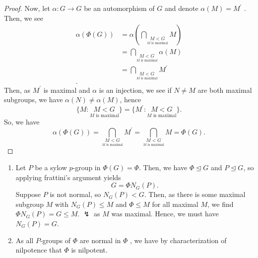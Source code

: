 \documentclass[a4paper]{article}
\begin{document}
\begin{solution}[2]
	\begin{proof}
		Now, let \(\alpha: G \to G\)  be an automorphism of \(G\) and denote \(\alpha \left( M \right)  = M^{\prime}\) . Then, we see
\begin{align*}
\alpha \left( \Phi \left( G \right)  \right)  &= \alpha\left( \bigcap_{\underset{M \text{ is maximal}}{M < G}} M \right)  \\
						      &= \bigcap_{ \underset{ M \text{ is maximal}}{M < G}} \alpha \left( M \right)   \\
						      &= \bigcap_{\underset{M \text{ is maximal}}{M < G}} M^{\prime} \\
.\end{align*}
Then, as \(M^{\prime}\) is maximal and \(\alpha\) is an injection, we see if \(N \neq M\) are both maximal subgroups, we have \(\alpha \left( N \right)  \neq \alpha \left( M \right) \), hence \[\{ M :  \underset{ M \text{ is maximal}}{M < G}\}  = \{M^{\prime} :  \underset{ M \text{ is maximal}}{M < G}\} .\] So, we have \[
	\alpha\left( \Phi \left( G \right)  \right)  = \bigcap_{ \underset{ M \text{ is maximal}}{M < G}} M^{\prime} = \bigcap_{ \underset{ M \text{ is maximal}}{M < G}} M = \Phi\left( G \right)
.\]
\end{proof}
\end{solution}
\newpage
\begin{solution}[3]
\begin{enumerate}
	\item Let \(P\) be a sylow \(p\)-group in \(\Phi\left( G \right) = \Phi \). Then, we have \(\Phi \trianglelefteq G\)  and \(P \trianglelefteq G\), so applying frattini's argument yields \[
			G = \Phi N_{G}\left( P \right)
	.\]
	Suppose \(P\) is not normal, so \(N_{G}\left( P \right) < G\). Then, as there is some maximal subgroup \(M\) with \(N_{G}\left( P \right)  \le M\) and \(\Phi \le M\) for all maximal \(M\), we find \(\Phi N_{G}\left( P \right) = G \le M\). \(\lightning\) as \(M\) was maximal. Hence, we must have \(N_{G}\left( P \right)  = G\).
\item As all \(P\)-groups of \(\Phi\) are normal in \(\Phi\) , we have by characterization of nilpotence that \(\Phi\) is nilpotent.
\end{enumerate}
\end{solution}
\newpage
\end{document}
